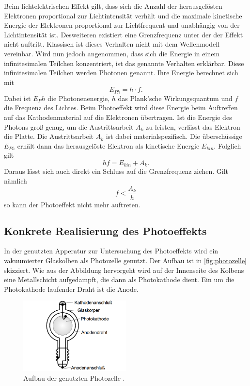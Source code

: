 Beim lichtelektrischen Effekt gilt, dass sich die Anzahl der herausgelösten Elektronen proportional zur Lichtintensität verhält und die maximale kinetische Energie der Elektronen
proportional zur Lichtfrequent und unabhängig von der Lichtintensität ist. 
Desweiteren existiert eine Grenzfrequenz unter der der Effekt nicht auftritt.
Klassisch ist dieses Verhalten nicht mit dem Wellenmodell vereinbar. Wird nun jedoch angenommen, dass sich die Energie in einem infinitesimalen Teilchen konzentriert, ist das
genannte Verhalten erklärbar. Diese infinitesimalen Teilchen werden Photonen genannt. Ihre Energie berechnet sich mit
\begin{equation*}
    E_{Ph} = h \cdot f.
\end{equation*}
Dabei ist $E_Ph$ die Photonenenergie, $h$ das Plank'sche Wirkungsquantum und $f$ die Frequenz des Lichtes.
Beim Photoeffekt wird diese Energie beim Auftreffen auf das Kathodenmaterial auf die Elektronen übertragen. Ist die Energie des Photons groß genug, um die 
Austrittsarbeit $A_k$ zu leisten, verlässt das Elektron die Platte. Die Austrittsarbeit $A_k$ ist dabei materialspezifisch. Die überschüssige $E_{Ph}$ erhält dann das 
herausgelöste Elektron als kinetische Energie $E_{kin}$. Folglich gilt
\begin{equation}\label{eq:energie_e}
    hf = E_{kin} + A_k.
\end{equation}
Daraus lässt sich auch direkt ein Schluss auf die Grenzfrequenz ziehen. Gilt nämlich
\begin{equation*}
    f < \frac{A_k}{h}
\end{equation*}
so kann der Photoeffekt nicht mehr auftreten.

\subsection{Konkrete Realisierung des Photoeffekts}
In der genutzten Apperatur zur Untersuchung des Photoeffekts wird ein vakuumierter Glaskolben als Photozelle genutzt. Der Aufbau ist in \autoref{fig:photozelle} skizziert.
Wie aus der Abbildung hervorgeht wird auf der Innenseite des Kolbens eine Metallschicht aufgedampft, die dann als Photokathode dient. Ein um die Photokathode laufender Draht
ist die Anode.

\begin{figure}[H]
    \centering
    \includegraphics[width=0.5\textwidth]{img/photozelle.png}
    \caption{Aufbau der genutzten Photozelle \cite{V500}.}
    \label{fig:photozelle}
\end{figure}

